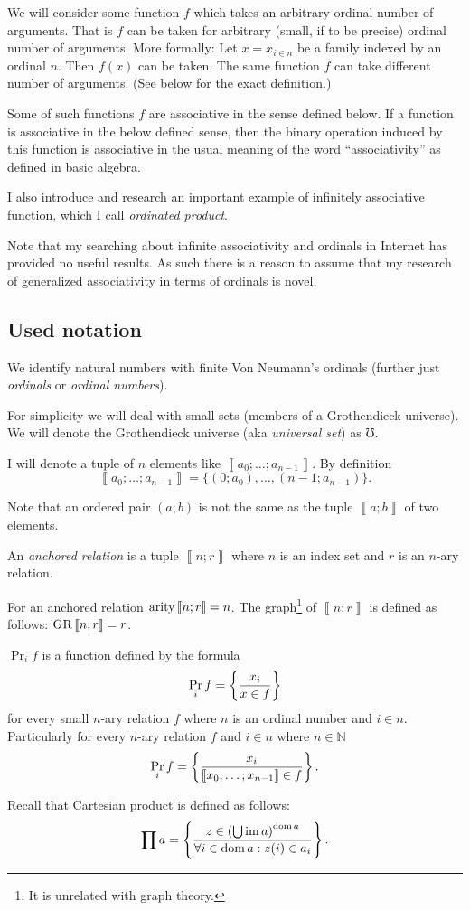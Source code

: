 We will consider some function $f$ which takes an arbitrary ordinal
number of arguments. That is $f$ can be taken for arbitrary (small,
if to be precise) ordinal number of arguments. More formally: Let
$x=x_{i\in n}$ be a family indexed by an ordinal $n$. Then $f(x)$
can be taken. The same function $f$ can take different number of
arguments. (See below for the exact definition.)

Some of such functions $f$ are associative in the sense defined below.
If a function is associative in the below defined sense, then the
binary operation induced by this function is associative in the usual
meaning of the word ``associativity'' as defined in basic algebra.

I also introduce and research an important example of infinitely associative
function, which I call \emph{ordinated product}.

Note that my searching about infinite associativity and ordinals in
Internet has provided no useful results. As such there is a reason
to assume that my research of generalized associativity in terms of
ordinals is novel.


\subsection{Used notation}

We identify natural numbers with finite Von Neumann's
ordinals (further just \emph{ordinals} or \emph{ordinal numbers}).

For simplicity we will deal with small sets (members of a Grothendieck
universe). We will denote the Grothendieck universe (aka \emph{universal
set}) as $\mho$.

I will denote a tuple of $n$ elements like $\left\llbracket a_{0};\ldots;a_{n-1}\right\rrbracket $.
By definition
\[
\left\llbracket a_{0};\ldots;a_{n-1}\right\rrbracket =\{(0;a_{0}),\ldots,(n-1;a_{n-1})\}.
\]


Note that an ordered pair $(a;b)$ is not the same as the tuple $\left\llbracket a;b\right\rrbracket $
of two elements.
\begin{defn}
An \emph{anchored relation} is a tuple $\left\llbracket n;r\right\rrbracket $
where $n$ is an index set and $r$ is an $n$-ary relation.
\end{defn}
For an anchored relation $\operatorname{arity}\left\llbracket n;r\right\rrbracket =n$.
The graph\footnote{It is unrelated with graph theory.} of $\left\llbracket n;r\right\rrbracket $
is defined as follows: $\operatorname{GR}\left\llbracket n;r\right\rrbracket =r$.
\begin{defn}
$\Pr_{i}f$ is a function defined by the formula
\[
\Pr_{i}f=\left\{ \frac{x_{i}}{x\in f}\right\}
\]
for every small $n$-ary relation $f$ where $n$ is an ordinal number
and $i\in n$. Particularly for every $n$-ary relation $f$ and $i\in n$
where $n\in\mathbb{N}$
\[
\Pr_{i}f=\left\{ \frac{x_{i}}{\left\llbracket x_{0};\ldots;x_{n-1}\right\rrbracket \in f}\right\}.
\]

\end{defn}
Recall that Cartesian product is defined
as follows:
\[
\prod a=\left\{ \frac{z\in\left(\bigcup\operatorname{im} a\right)^{\operatorname{dom} a}}{\forall i\in\operatorname{dom} a:z(i)\in a_{i}}\right\}.
\]

